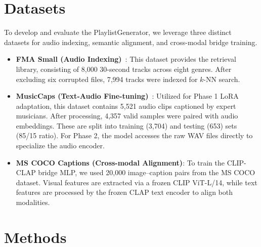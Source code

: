\documentclass[11pt]{article}
\begin{document}
\section{Datasets}
To develop and evaluate the PlaylistGenerator, we leverage three distinct datasets for audio indexing, semantic alignment, and cross-modal bridge training.\begin{itemize}
\item \textbf{FMA Small (Audio Indexing)}~\cite{defferrard2017fma}: This dataset provides the retrieval library, consisting of 8,000 30-second tracks across eight genres. After excluding six corrupted files, 7,994 tracks were indexed for $k$-NN search.
\item \textbf{MusicCaps (Text-Audio Fine-tuning)}~\cite{agostinelli2023musiclm}: Utilized for Phase 1 LoRA adaptation, this dataset contains 5,521 audio clips captioned by expert musicians. After processing, 4,357 valid samples were paired with audio embeddings. These are split into training (3,704) and testing (653) sets (85/15 ratio). For Phase 2, the model accesses the raw WAV files directly to specialize the audio encoder.

\item \textbf{MS COCO Captions (Cross-modal Alignment)}: To train the CLIP-CLAP bridge MLP, we used 20,000 image--caption pairs from the MS COCO dataset. Visual features are extracted via a frozen CLIP ViT-L/14, while text features are processed by the frozen CLAP text encoder to align both modalities.

\end{itemize}

\section{Methods}
\end{document}
